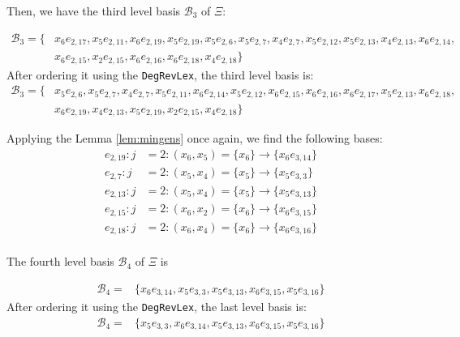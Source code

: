\documentclass{article}
\theoremstyle{definition}
\theoremstyle{remark}
\theoremstyle{example}
\begin{document}
Then, we have the third level basis $\mathcal{B}_3$ of $\Xi$:

\begin{equation}
    \begin{aligned}
        \mathcal{B}_3 = \{&x_6e_{2,17},x_5e_{2,11},x_6e_{2,19},x_5e_{2,19},x_5e_{2,6},x_5e_{2,7},x_4e_{2,7},x_5e_{2,12},x_5e_{2,13},x_4e_{2,13},x_6e_{2,14},\\
        &x_6e_{2,15},x_2e_{2,15},x_6e_{2,16},x_6e_{2,18},x_4e_{2,18}\}
    \end{aligned}
\end{equation}
After ordering it using the \verb+DegRevLex+, the third level basis is:
\begin{equation}
    \begin{aligned}
        \mathcal{B}_3 = \{&x_5e_{2,6},x_5e_{2,7},x_4e_{2,7},x_5e_{2,11},x_6e_{2,14},x_5e_{2,12},x_6e_{2,15},x_6e_{2,16},x_6e_{2,17},x_5e_{2,13},x_6e_{2,18},\\
        & x_6e_{2,19},x_4e_{2,13},x_5e_{2,19},x_2e_{2,15},x_4e_{2,18}\}
    \end{aligned}
\end{equation}

Applying the Lemma \ref{lem:mingens} once again, we find the following bases:
\begin{align}
    e_{2,19}: j &= 2: (x_6,x_5) = \{x_6\} \rightarrow\{x_6e_{3,14}\}\\
    e_{2,7}: j &= 2: (x_5,x_4) = \{x_5\} \rightarrow\{x_5e_{3,3}\}\\
    e_{2,13}: j &= 2: (x_5,x_4) = \{x_5\} \rightarrow\{x_5e_{3,13}\}\\
    e_{2,15}: j &= 2: (x_6,x_2) = \{x_6\} \rightarrow\{x_6e_{3,15}\}\\
    e_{2,18}: j &= 2: (x_6,x_4) = \{x_6\} \rightarrow\{x_6e_{3,16}\}\\
\end{align}

The fourth level basis $\mathcal{B}_4$ of $\Xi$ is

\begin{equation}
    \begin{aligned}
        \mathcal{B}_4 = &\{x_6e_{3,14},x_5e_{3,3},x_5e_{3,13},x_6e_{3,15},x_5e_{3,16}\}
    \end{aligned}
\end{equation}
After ordering it using the \verb+DegRevLex+, the last level basis is:
\begin{equation}
    \begin{aligned}
        \mathcal{B}_4 = &\{x_5e_{3,3},x_6e_{3,14},x_5e_{3,13},x_6e_{3,15},x_5e_{3,16}\}
    \end{aligned}
\end{equation}
\end{document}
